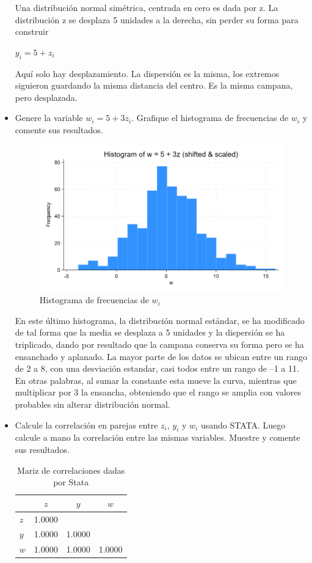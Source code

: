 \documentclass[12pt]{article}
\begin{document}
\begin{itemize}
    Una distribución normal simétrica, centrada en cero es dada por z.
La distribución z se desplaza 5 unidades a la derecha, sin perder su forma para construir


$y_i=5+z_i$

Aquí solo hay desplazamiento. La dispersión es la misma, los extremos siguieron guardando la misma distancia del centro. Es la misma campana, pero desplazada.

    \item Genere la variable $w_i=5+3z_i$. Grafique el histograma de frecuencias de $w_i$ y comente sus resultados.

    \begin{figure}[h!]
        \centering
        \includegraphics[width=0.75\linewidth]{Figures/hist_w.png}
        \caption{Histograma de frecuencias de $w_i$}
        \label{fig:Hist_w}
    \end{figure}

    En este último histograma, la distribución normal estándar, se ha modificado de tal forma que la media se desplaza a 5 unidades y la dispersión se ha triplicado, dando por resultado que la campana conserva su forma  pero se ha ensanchado y aplanado. La mayor parte de los datos se ubican entre un rango de 2 a 8, con una desviación estandar, casi todos entre un rango de –1 a 11. En otras palabras, al sumar la constante esta mueve la curva, mientras que multiplicar por 3 la ensancha, obteniendo que el rango se amplia con valores probables sin alterar distribución normal.

    \item Calcule la correlación en parejas entre $z_i$, $y_i$ y $w_i$ usando STATA. Luego calcule a mano la correlación entre las mismas variables. Muestre y comente sus resultados.

    \begin{table}[h!]
    \centering
    \caption{Mariz de correlaciones dadas por Stata}
    \begin{tabular}{lccc}
    \hline
                & $z$     & $y$     & $w$     \\
    \hline
    $z$         & 1.0000  &         &         \\
    $y$         & 1.0000  & 1.0000  &         \\
    $w$         & 1.0000  & 1.0000  & 1.0000  \\
    \hline
    \end{tabular}
    \end{table}   
    
\end{itemize}
\end{document}
